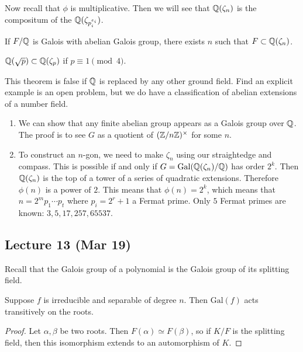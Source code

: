 \documentclass[10pt, twoside]{article}
\begin{document}
        Now recall that $\phi$ is multiplicative. Then we will see that $\mathbb{Q}(\zeta_n)$ is the compositum of the $\mathbb{Q}(\zeta_{p_i^{e_i}})$.

        \begin{thm}
            If $F/\mathbb{Q}$ is Galois with abelian Galois group, there exists $n$ such that $F \subset \mathbb{Q}(\zeta_n)$.
        \end{thm}

        \begin{exm}
            $\mathbb{Q}(\sqrt{p}) \subset \mathbb{Q}(\zeta_p)$ if $p \equiv 1 \pmod 4$.
        \end{exm}

        \begin{rmk}
            This theorem is false if $\mathbb{Q}$ is replaced by any other ground field. Find an explicit example is an open problem, but we do have a classification of abelian extensions of a number field.
        \end{rmk}

        \begin{rmk}
            \begin{enumerate}
                \item We can show that any finite abelian group appears as a Galois group over $\mathbb{Q}$. The proof is to see $G$ as a quotient of $(\mathbb{Z}/n\mathbb{Z})^{\times}$ for some $n$.
                \item To construct an $n$-gon, we need to make $\zeta_n$ using our straightedge and compass. This is possible if and only if $G = \mathrm{Gal}(\mathbb{Q}(\zeta_n)/\mathbb{Q})$ has order $2^k$. Then $\mathbb{Q}(\zeta_n)$ is the top of a tower of a series of quadratic extensions. Therefore $\phi(n)$ is a power of $2$. This means that $\phi(n) = 2^k$, which means that $n = 2^mp_1\cdots p_t$ where $p_i = 2^r+1$ a Fermat prime. Only $5$ Fermat primes are known: $3,5,17,257,65537$.
            \end{enumerate}
        \end{rmk}

        \subsection{Lecture 13 (Mar 19)}
        Recall that the Galois group of a polynomial is the Galois group of its splitting field.

        \begin{prop}
            Suppose $f$ is irreducible and separable of degree $n$. Then $\mathrm{Gal}(f)$ acts transitively on the roots.
            \begin{proof}
                Let $\alpha, \beta$ be two roots. Then $F(\alpha) \simeq F(\beta)$, so if $K/F$ is the splitting field, then this isomorphism extends to an automorphism of $K$.
            \end{proof}
        \end{prop}
\end{document}
